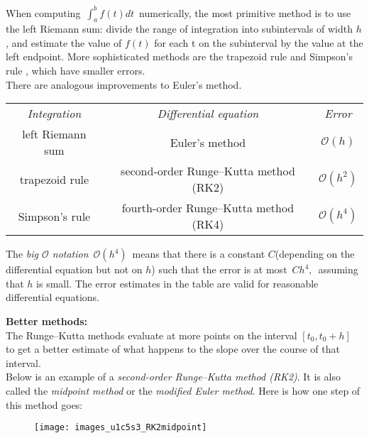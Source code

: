 When computing $\, \int_a ^b f(t) dt \,$ numerically,
the most primitive method is to use the left Riemann sum:
divide the range of integration into subintervals of width $h$,
and estimate the value of $f(t)$ for each t on the subinterval by the value at the left endpoint.
More sophisticated methods are the trapezoid rule and Simpson's rule , which have smaller errors.\\

There are analogous improvements to Euler's method.

\begin{table}[ht!]
  \centering
  \begin{tabular}{ccc}
    \emph{\color{blue} Integration} & \emph{\color{blue} Differential equation} & \emph{\color{blue} Error} \\
    left Riemann sum   & Euler's method     & $\mathcal{O}(h)$ \\
    trapezoid rule & second-order Runge–Kutta method (RK2) & $\mathcal{O}(h^2)$ \\
    Simpson's rule & fourth-order Runge–Kutta method (RK4) & $\mathcal{O}(h^4)$
  \end{tabular}
\end{table}

The \emph{\color{blue} big $\mathcal{O}$ notation} $\, \mathcal{O}(h^4) \,$ 
means that there is a constant $C$(depending on the differential equation but not on $h$)
such that the error is at most $\, Ch^4,\,$ assuming that $h$ is small.
The error estimates in the table are valid for reasonable differential equations.

\textbf{\color{blue}Better methods:}\\

The Runge–Kutta methods evaluate at more points on the interval $[t_0,t_0 + h]$
to get a better estimate of what happens to the slope over the course of that interval.\\
Below is an example of a \emph{\color{blue}second-order Runge–Kutta method (RK2)}.
It is also called the \emph{\color{blue}midpoint method} or the \emph{\color{blue}modified Euler method}. 
Here is how one step of this method goes:

\begin{figure}[ht!]
  \centering
  \texttt{[image: images\_u1c5s3\_RK2midpoint]}
\end{figure}

